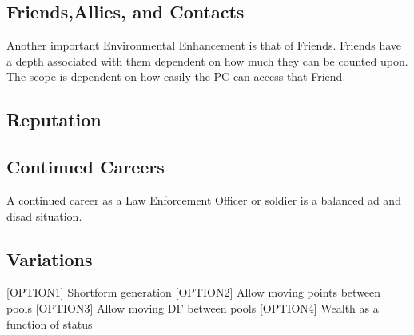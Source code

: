 \subsection{Friends,Allies, and Contacts}

Another important Environmental Enhancement is that of Friends. Friends
have a depth associated with them dependent on how much they can be
counted upon. The scope is dependent on how easily the PC can access
that Friend.

\subsection{Reputation}

\subsection*{Continued Careers}
A continued career as a Law Enforcement Officer or soldier is a
balanced ad and disad situation.

\subsection{Variations}

[OPTION1] Shortform generation
[OPTION2] Allow moving points between pools
[OPTION3] Allow moving DF between pools
[OPTION4] Wealth as a function of status


